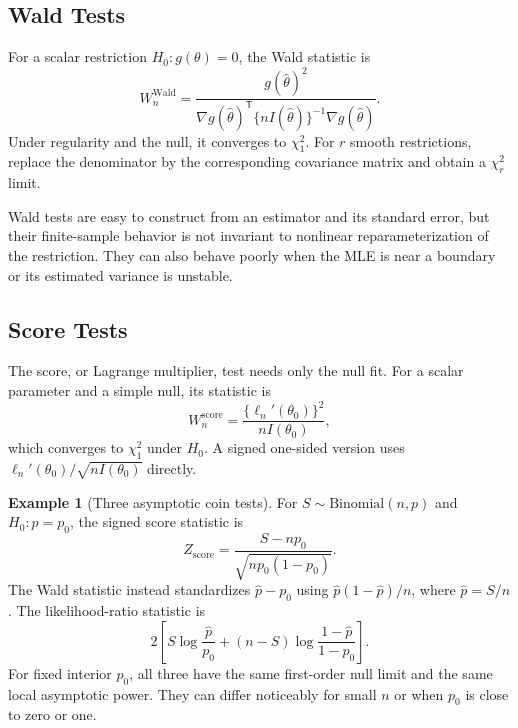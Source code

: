 \documentclass[12pt,oneside]{book}
\numberwithin{equation}{section}
\theoremstyle{definition}
\newtheorem{example}{Example}[section]
\theoremstyle{plain}
\theoremstyle{remark}
\newcommand{\grad}{\nabla}
\newcommand{\Bin}{\mathrm{Binomial}}
\begin{document}
\subsection{Wald Tests}

For a scalar restriction $H_0:g(\theta)=0$, the Wald statistic is
\begin{equation}
    W_n^{\mathrm{Wald}}
    =\frac{g(\widehat\theta)^2}
    {\grad g(\widehat\theta)^\mathsf T
     \{nI(\widehat\theta)\}^{-1}\grad g(\widehat\theta)}.
    \label{eq:wald-statistic}
\end{equation}
Under regularity and the null, it converges to $\chi_1^2$.  For $r$ smooth
restrictions, replace the denominator by the corresponding covariance matrix
and obtain a $\chi_r^2$ limit.

Wald tests are easy to construct from an estimator and its standard error,
but their finite-sample behavior is not invariant to nonlinear
reparameterization of the restriction.  They can also behave poorly when the
MLE is near a boundary or its estimated variance is unstable.

\subsection{Score Tests}

The score, or Lagrange multiplier, test needs only the null fit.  For a scalar
parameter and a simple null, its statistic is
\begin{equation}
    W_n^{\mathrm{score}}
    =\frac{\{\ell_n'(\theta_0)\}^2}{nI(\theta_0)},
    \label{eq:score-test-statistic}
\end{equation}
which converges to $\chi_1^2$ under $H_0$.  A signed one-sided version uses
$\ell_n'(\theta_0)/\sqrt{nI(\theta_0)}$ directly.

\begin{example}[Three asymptotic coin tests]
For $S\sim\Bin(n,p)$ and $H_0:p=p_0$, the signed score statistic is
\[
    Z_{\mathrm{score}}
    =\frac{S-np_0}{\sqrt{np_0(1-p_0)}}.
\]
The Wald statistic instead standardizes $\widehat p-p_0$ using
$\widehat p(1-\widehat p)/n$, where $\widehat p=S/n$.  The likelihood-ratio
statistic is
\[
 2\left[S\log\frac{\widehat p}{p_0}
 +(n-S)\log\frac{1-\widehat p}{1-p_0}\right].
\]
For fixed interior $p_0$, all three have the same first-order null limit and
the same local asymptotic power.  They can differ noticeably for small $n$ or
when $p_0$ is close to zero or one.
\end{example}
\end{document}
